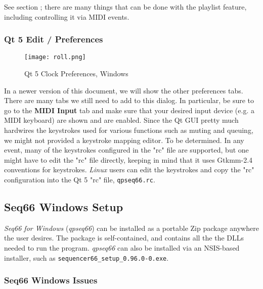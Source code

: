    See section ; there are many things that can be
   done with the playlist feature, including controlling it via MIDI events.

\subsubsection{Qt 5 Edit / Preferences}
\label{subsubsec:qt_portmidi_qt5_edit_prefs}

\begin{figure}[H]
   \centering 
   \texttt{[image: roll.png]}
   \caption{Qt 5 Clock Preferences, Windows}
   \label{fig:qt5_prefs_clock_windows}
\end{figure}

   In a newer version of this document, we will show the other preferences
   tabs.  There are many tabs we still need to add to this dialog.
   In particular, be sure to go to the \textbf{MIDI Input} tab and
   make sure that your desired input device (e.g. a MIDI keyboard) are shown
   and are enabled.
   Since the Qt GUI pretty much hardwires the keystrokes used for various
   functions such as muting and queuing, we might not provided a keystroke
   mapping editor.  To be determined.
   In any event, many of the keystrokes configured in the "rc" file are
   supported, but one might have to edit the "rc" file directly, keeping
   in mind that it uses Gtkmm-2.4 conventions for keystrokes.
   \textsl{Linux} users can edit the keystrokes and copy the "rc" configuration
   into the Qt 5 "rc" file, \texttt{qpseq66.rc}.

\subsection{Seq66 Windows Setup}
\label{subsec:qt_portmidi_windows_setup}

   \textsl{Seq66 for Windows} (\textsl{qpseq66}) can be installed
   as a portable Zip package anywhere the user desires.  The package is
   self-contained, and contains all the the DLLs needed to run the program.
   \textsl{qpseq66} can also be installed via an NSIS-based installer,
   such as \texttt{sequencer66\_setup\_0.96.0-0.exe}.

\subsubsection{Seq66 Windows Issues}
\label{subsubsec:qt_portmidi_windows_setup_issues}

